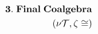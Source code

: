 \documentclass[preview]{standalone}
\begin{document}
\begin{align*}
\special{dvisvgm:raw <g id='unique000'>}\mathbf{3.\;Final\;Coalgebra}\\(\nu\mathcal{T}, \zeta\cong)\special{dvisvgm:raw </g>}
\end{align*}
\end{document}
